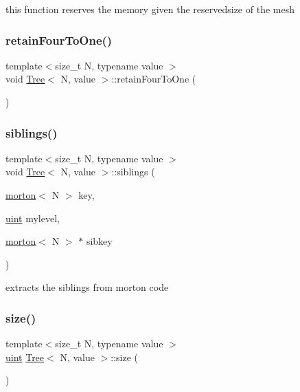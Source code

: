 this function reserves the memory given the reservedsize of the mesh \mbox{\label{classTree_a017dbf01d574294edbd8e9003e8d0002}} 
\subsubsection{\texorpdfstring{retain\+Four\+To\+One()}{retainFourToOne()}}
{\footnotesize\ttfamily template$<$size\+\_\+t N, typename value $>$ \\
void \mbox{\hyperlink{classTree}{Tree}}$<$ N, value $>$\+::retain\+Four\+To\+One (\begin{DoxyParamCaption}{ }\end{DoxyParamCaption})}

\mbox{\label{classTree_a33f60f27d0cf871b68bf2ed82638d1c7}} 
\subsubsection{\texorpdfstring{siblings()}{siblings()}}
{\footnotesize\ttfamily template$<$size\+\_\+t N, typename value $>$ \\
void \mbox{\hyperlink{classTree}{Tree}}$<$ N, value $>$\+::siblings (\begin{DoxyParamCaption}\item[{\mbox{\hyperlink{definitions_8h_af8682350bd8bb38ee9023f7a0a310add}{morton}}$<$ N $>$}]{key,  }\item[{\mbox{\hyperlink{definitions_8h_a69aa29b598b851b0640aa225a9e5d61d}{uint}}}]{mylevel,  }\item[{\mbox{\hyperlink{definitions_8h_af8682350bd8bb38ee9023f7a0a310add}{morton}}$<$ N $>$ $\ast$}]{sibkey }\end{DoxyParamCaption})}

extracts the siblings from morton code \mbox{\label{classTree_a8af31c93aa821f0d853e920bcba1829a}} 
\subsubsection{\texorpdfstring{size()}{size()}}
{\footnotesize\ttfamily template$<$size\+\_\+t N, typename value $>$ \\
\mbox{\hyperlink{definitions_8h_a69aa29b598b851b0640aa225a9e5d61d}{uint}} \mbox{\hyperlink{classTree}{Tree}}$<$ N, value $>$\+::size (\begin{DoxyParamCaption}{ }\end{DoxyParamCaption})\hspace{0.3cm}{\ttfamily [virtual]}}


